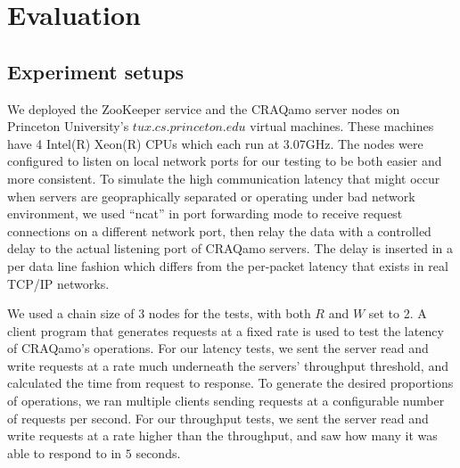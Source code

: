 \section{Evaluation}
\label{sec:eval}

\subsection{Experiment setups}
We deployed the ZooKeeper service and the CRAQamo server nodes on Princeton University's $tux.cs.princeton.edu$ virtual machines.
These machines have 4 Intel(R) Xeon(R) CPUs which each run at 3.07GHz. The nodes were configured to listen on local network ports for our testing to be both easier and more consistent. To simulate the high communication latency that might occur when servers are geopraphically separated or operating under bad network environment, we used ``ncat'' in port forwarding mode to receive request connections on a different network port, then relay the data with a controlled delay to the actual listening port of CRAQamo servers. The delay is inserted in a per data line fashion which differs from the per-packet latency that exists in real TCP/IP networks. 

We used a chain size of 3 nodes for the tests, with both $R$ and $W$ set to 2. A client program that generates requests at a fixed rate is used to test the latency of CRAQamo's operations. For our latency tests, we sent the server read and write requests at a rate much underneath the servers' throughput threshold, and calculated the time from request to response.  To generate the desired proportions of operations, we ran multiple clients sending requests at a configurable number of requests per second.  For our throughput tests, we sent the server read and write requests at a rate higher than the throughput, and saw how many it was able to respond to in $5$ seconds.

